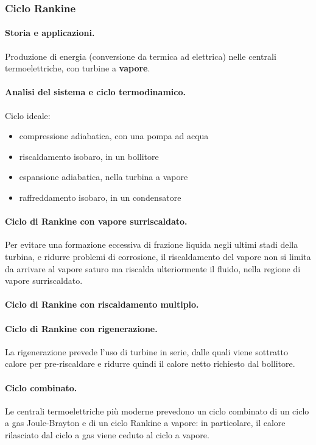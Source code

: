 \subsubsection{Ciclo Rankine}
\paragraph{Storia e applicazioni.} {\color{red} Produzione di energia (conversione da termica ad elettrica) nelle centrali termoelettriche, con turbine a \textbf{vapore}.}
\paragraph{Analisi del sistema e ciclo termodinamico.}
Ciclo ideale:
\begin{itemize}
    \item compressione adiabatica, con una pompa ad acqua
    \item riscaldamento isobaro, in un bollitore
    \item espansione adiabatica, nella turbina a vapore
    \item raffreddamento isobaro, in un condensatore
\end{itemize}
\paragraph{Ciclo di Rankine con vapore surriscaldato.} Per evitare una formazione eccessiva di frazione liquida negli ultimi stadi della turbina, e ridurre problemi di corrosione, il riscaldamento del vapore non si limita da arrivare al vapore saturo ma riscalda ulteriormente il fluido, nella regione di vapore surriscaldato.
\paragraph{Ciclo di Rankine con riscaldamento multiplo.}
\paragraph{Ciclo di Rankine con rigenerazione.} La rigenerazione prevede l'uso di turbine in serie, dalle quali viene sottratto calore per pre-riscaldare e ridurre quindi il calore netto richiesto dal bollitore.
\paragraph{Ciclo combinato.} Le centrali termoelettriche più moderne prevedono un ciclo combinato di un ciclo a gas Joule-Brayton e di un ciclo Rankine a vapore: in particolare, il calore rilasciato dal ciclo a gas viene ceduto al ciclo a vapore.

